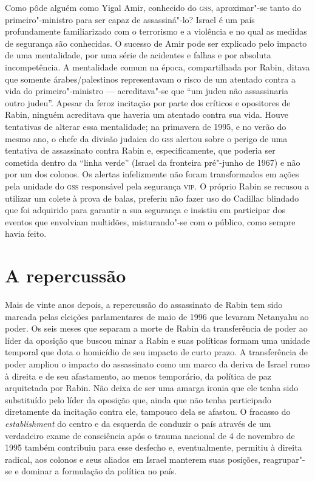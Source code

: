 Como pôde alguém como Yigal Amir, conhecido do \textsc{gss}, aproximar"-se tanto
do primeiro"-ministro para ser capaz de assassiná"-lo? Israel é
um país profundamente familiarizado com o terrorismo e a violência e no
qual as medidas de segurança são conhecidas. O sucesso de Amir pode ser
explicado pelo impacto de uma mentalidade, por uma série de acidentes e
falhas e por absoluta incompetência. A mentalidade comum na época,
compartilhada por Rabin, ditava que somente árabes/palestinos
representavam o risco de um atentado contra a vida do primeiro"-ministro
--- acreditava"-se que ``um judeu não assassinaria outro judeu''. Apesar
da feroz incitação por parte dos críticos e opositores de Rabin, ninguém
acreditava que haveria um atentado contra sua vida. Houve tentativas de
alterar essa mentalidade; na primavera de 1995, e no verão do mesmo ano,
o chefe da divisão judaica do \textsc{gss} alertou sobre o perigo de uma
tentativa de assassinato contra Rabin e, especificamente, que poderia
ser cometida dentro da ``linha verde'' (Israel da fronteira pré"-junho de
1967) e não por um dos colonos. Os alertas infelizmente não foram
transformados em ações pela unidade do \textsc{gss} responsável pela segurança
\textsc{vip}. O próprio Rabin se recusou a utilizar um colete à prova de balas,
preferiu não fazer uso do Cadillac blindado que foi adquirido para
garantir a sua segurança e insistiu em participar dos eventos que
envolviam multidões, misturando"-se com o público, como sempre havia
feito.

\section{A repercussão}

Mais de vinte anos depois, a repercussão do assassinato de Rabin tem
sido marcada pelas eleições parlamentares de maio de 1996 que levaram
Netanyahu ao poder. Os seis meses que separam a morte de Rabin da
transferência de poder ao líder da oposição que buscou minar a Rabin e
suas políticas formam uma unidade temporal que dota o homicídio de
seu impacto de curto prazo. A transferência de poder ampliou o impacto
do assassinato como um marco da deriva de Israel rumo à direita e de seu
afastamento, ao menos temporário, da política de paz arquitetada por
Rabin. Não deixa de ser uma amarga ironia que ele tenha sido substituído
pelo líder da oposição que, ainda que não tenha participado diretamente
da incitação contra ele, tampouco dela se afastou. O fracasso do
\textit{establishment} do centro e da esquerda de conduzir o país através
de um verdadeiro exame de consciência após o trauma nacional de 4 de
novembro de 1995 também contribuiu para esse desfecho e, eventualmente,
permitiu à direita radical, aos colonos e seus aliados em Israel
manterem suas posições, reagrupar"-se e dominar a formulação da política
no país.


